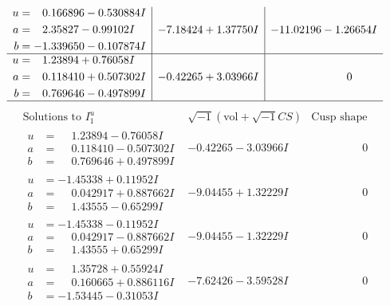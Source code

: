 \documentclass[1p]{elsarticle_modified}
\theoremstyle{definition}
\newcommand{\I}{\sqrt{-1}}
\begin{document}
$$\begin{array}{c|c|c}
\begin{aligned}
u &= \phantom{-}0.166896 - 0.530884 I \\
a &= \phantom{-}2.35827 - 0.99102 I \\
b &= -1.339650 - 0.107874 I\end{aligned}
 & -7.18424 + 1.37750 I & -11.02196 - 1.26654 I \\ \hline\begin{aligned}
u &= \phantom{-}1.23894 + 0.76058 I \\
a &= \phantom{-}0.118410 + 0.507302 I \\
b &= \phantom{-}0.769646 - 0.497899 I\end{aligned}
 & -0.42265 + 3.03966 I & \phantom{-0.000000 } 0\\
 \hline 
 \end{array}$$\newpage$$\begin{array}{c|c|c}  
\text{Solutions to }I^u_{1}& \I (\text{vol} + \sqrt{-1}CS) & \text{Cusp shape}\\
 \hline 
\begin{aligned}
u &= \phantom{-}1.23894 - 0.76058 I \\
a &= \phantom{-}0.118410 - 0.507302 I \\
b &= \phantom{-}0.769646 + 0.497899 I\end{aligned}
 & -0.42265 - 3.03966 I & \phantom{-0.000000 } 0 \\ \hline\begin{aligned}
u &= -1.45338 + 0.11952 I \\
a &= \phantom{-}0.042917 + 0.887662 I \\
b &= \phantom{-}1.43555 - 0.65299 I\end{aligned}
 & -9.04455 + 1.32229 I & \phantom{-0.000000 } 0 \\ \hline\begin{aligned}
u &= -1.45338 - 0.11952 I \\
a &= \phantom{-}0.042917 - 0.887662 I \\
b &= \phantom{-}1.43555 + 0.65299 I\end{aligned}
 & -9.04455 - 1.32229 I & \phantom{-0.000000 } 0 \\ \hline\begin{aligned}
u &= \phantom{-}1.35728 + 0.55924 I \\
a &= \phantom{-}0.160665 + 0.886116 I \\
b &= -1.53445 - 0.31053 I\end{aligned}
 & -7.62426 - 3.59528 I & \phantom{-0.000000 } 0 \\ \hline\begin{aligned}

\end{aligned}
\end{array}$$
\end{document}
